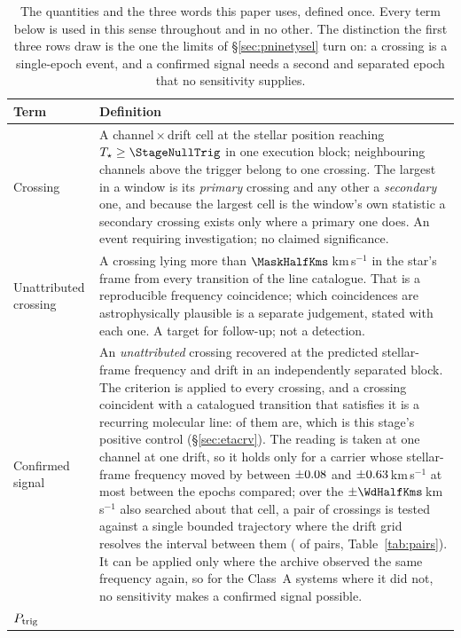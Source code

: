 \begin{table}
\centering
\caption{The quantities and the three words this paper uses, defined once.
Every term below is used in this sense throughout and in no other. The
distinction the first three rows draw is the one the limits of
\S\ref{sec:pninetysel} turn on: a crossing is a single-epoch event, and a
confirmed signal needs a second and separated epoch that no sensitivity
supplies.}
\label{tab:quantities}
\small
\begin{tabular}{@{}p{}p{}@{}}
\hline
Term & Definition \\
\hline
Crossing &
A channel\,$\times$\,drift cell at the stellar position reaching
$T_\star\geq\StageNullTrig$ in one execution block; neighbouring channels
above the trigger belong to one crossing. The largest in a window is its
\emph{primary} crossing and any other a \emph{secondary} one, and because the
largest cell is the window's own statistic a secondary crossing exists only
where a primary one does. An event requiring investigation; no claimed
significance. \\
Unattributed crossing &
A crossing lying more than $\MaskHalfKms$\,km\,s$^{-1}$ in the star's frame
from every transition of the line catalogue. That is a reproducible frequency
coincidence; which coincidences are astrophysically plausible is a separate
judgement, stated with each one. A target for follow-up; not a detection. \\
Confirmed signal &
An \emph{unattributed} crossing recovered at the predicted stellar-frame
frequency and drift in an independently separated block. The criterion is
applied to every crossing, and a crossing coincident with a catalogued
transition that satisfies it is a recurring molecular line:
\MkAttrRecur{} of them are, which is this stage's positive control
(\S\ref{sec:etacrv}). The reading is taken at one channel at one drift, so it
holds only for a carrier whose stellar-frame frequency moved by between
$\pm0.08$ and $\pm0.63$\,km\,s$^{-1}$ at most between the epochs
compared; over the $\pm\WdHalfKms$\,km\,s$^{-1}$ also searched about that
cell, a pair of crossings is tested against a single bounded trajectory where
the drift grid resolves the interval between them (\TjNPower{} of \TjNPair{}
pairs, Table~\ref{tab:pairs}). It can be applied only where the archive
observed the same frequency again, so for the \ScSysNoConf{} Class~A systems
where it did not, no sensitivity makes a confirmed signal possible. \\
$P_{\rm trig}$ &

\end{tabular}
\end{table}
